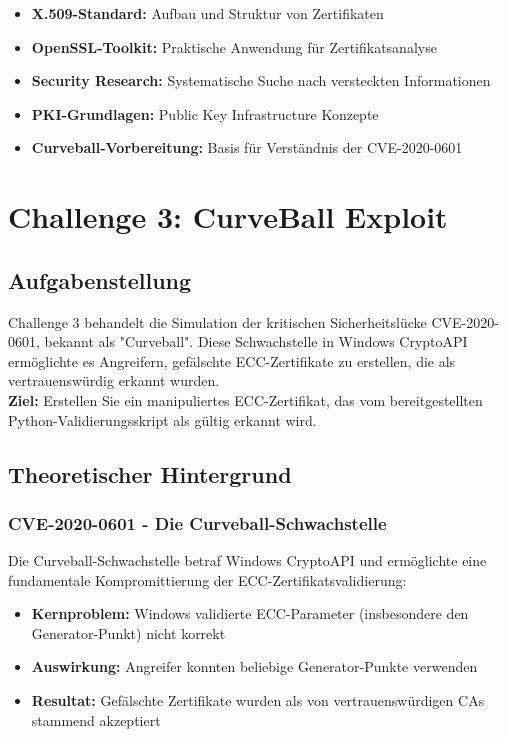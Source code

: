 \documentclass{article}
\begin{document}
\begin{itemize}
    \item \textbf{X.509-Standard:} Aufbau und Struktur von Zertifikaten
    \item \textbf{OpenSSL-Toolkit:} Praktische Anwendung für Zertifikatsanalyse
    \item \textbf{Security Research:} Systematische Suche nach versteckten Informationen
    \item \textbf{PKI-Grundlagen:} Public Key Infrastructure Konzepte
    \item \textbf{Curveball-Vorbereitung:} Basis für Verständnis der CVE-2020-0601
\end{itemize}

\newpage

\section{Challenge 3: CurveBall Exploit}

\subsection{Aufgabenstellung}

\noindent
Challenge 3 behandelt die Simulation der kritischen Sicherheitslücke CVE-2020-0601, bekannt als "Curveball". Diese Schwachstelle in Windows CryptoAPI ermöglichte es Angreifern, gefälschte ECC-Zertifikate zu erstellen, die als vertrauenswürdig erkannt wurden.
\\
\noindent
\textbf{Ziel:} Erstellen Sie ein manipuliertes ECC-Zertifikat, das vom bereitgestellten Python-Validierungsskript als gültig erkannt wird.

\subsection{Theoretischer Hintergrund}

\subsubsection{CVE-2020-0601 - Die Curveball-Schwachstelle}

Die Curveball-Schwachstelle betraf Windows CryptoAPI und ermöglichte eine fundamentale Kompromittierung der ECC-Zertifikatsvalidierung:

\begin{itemize}
    \item \textbf{Kernproblem:} Windows validierte ECC-Parameter (insbesondere den Generator-Punkt) nicht korrekt
    \item \textbf{Auswirkung:} Angreifer konnten beliebige Generator-Punkte verwenden
    \item \textbf{Resultat:} Gefälschte Zertifikate wurden als von vertrauenswürdigen CAs stammend akzeptiert
\end{itemize}
\end{document}
